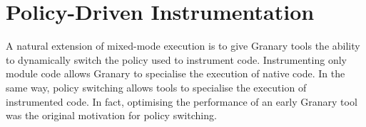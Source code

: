 \documentclass[preprint]{sigplanconf}
\begin{document}
%


\section{Policy-Driven Instrumentation}\label{sec:policies}

A natural extension of mixed-mode execution is to give Granary tools the ability to dynamically switch the policy used to instrument code. Instrumenting only module code allows Granary to specialise the execution of native code. In the same way, policy switching allows tools to specialise the execution of instrumented code. In fact, optimising the performance of an early Granary tool was the original motivation for policy switching.
\end{document}
